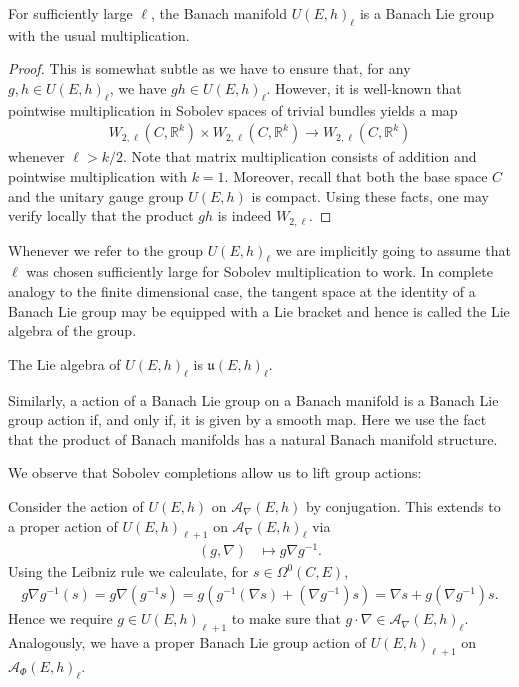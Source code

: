 \documentclass[12pt]{ociamthesis}  %
\begin{document}
\begin{example}\label{ex:unitary_banach_lie_group}
  For sufficiently large $\ell$, the Banach manifold $U(E,h)_\ell$ is a
  Banach Lie group with the usual multiplication.
  \begin{proof}
    This is somewhat subtle as we have to ensure that, for any
    $g,h\in U(E,h)_\ell$, we have $gh\in U(E,h)_\ell$. However, it
    is well-known that pointwise multiplication
    in Sobolev spaces of trivial bundles yields a map
    \begin{align*}
      W_{2,\ell}(C,\mathbb R^k) \times
      W_{2,\ell}(C,\mathbb R^k) \to
      W_{2,\ell}(C,\mathbb R^k)
    \end{align*}
    whenever $\ell > k/2$. \cite[Theorem 6.1]{behzadan2021}
    Note that matrix multiplication consists of addition and
    pointwise multiplication with $k=1$. Moreover, recall that both
    the base space $C$ and the unitary gauge group $U(E,h)$ is compact.
    Using these facts, one may verify locally that the product $gh$ is indeed $W_{2,\ell}$.
  \end{proof}
\end{example}

Whenever we refer to the group $U(E,h)_\ell$ we are implicitly going to
assume that $\ell$ was chosen sufficiently large for Sobolev multiplication
to work.
In complete analogy to the finite dimensional case, the tangent space
at the identity of a Banach Lie group may be equipped with a Lie bracket
and hence is called the Lie algebra of the group.

\begin{example}
  The Lie algebra of $U(E,h)_\ell$ is $\mathfrak u(E,h)_\ell$.
\end{example}

Similarly, a action of a Banach Lie group on a Banach manifold
is a Banach Lie group action if, and only if, it is given by a
smooth map. Here we use the fact that the product of Banach manifolds
has a natural Banach manifold structure.

We observe that Sobolev completions allow us to lift group
actions:

\begin{example}
  Consider the action of $U(E,h)$ on $\mathcal A_\nabla(E,h)$
  by conjugation. This extends to a proper action of $U(E,h)_{\ell+1}$
  on $\mathcal A_\nabla(E,h)_\ell$ via
  \begin{align*}
    (g,\nabla) & \mapsto g\nabla g^{-1}.
  \end{align*}
  Using the Leibniz rule we calculate, for $s\in\Omega^0(C,E)$,
  \begin{align*}
    g\nabla g^{-1}(s) = g\nabla(g^{-1}s) = g(g^{-1}(\nabla s) + (\nabla g^{-1})s)
    = \nabla s + g(\nabla g^{-1})s.
  \end{align*}
  Hence we require $g\in U(E,h)_{\ell + 1}$ to make sure that $g\cdot\nabla\in \mathcal A_\nabla(E,h)_\ell$.
  Analogously, we have a proper Banach Lie group action of $U(E,h)_{\ell+1}$
  on $\mathcal A_\Phi (E,h)_\ell$.
\end{example}
\end{document}
